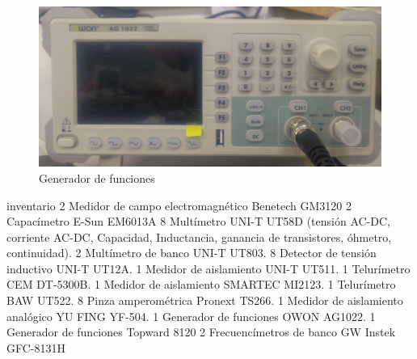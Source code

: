 \begin{figure}[htbp]
  \centering
  \includegraphics[width=\textwidth,height=\textheight,keepaspectratio]{images/fotos/generadordefunciones3.jpg}
  \caption{Generador de funciones}
  \label{fig:generador_funciones_3}
\end{figure}

inventario
2 Medidor de campo electromagnético Benetech GM3120
2 Capacímetro E-Sun EM6013A
8 Multímetro UNI-T UT58D (tensión AC-DC, corriente AC-DC, Capacidad, Inductancia, ganancia de transistores, óhmetro, continuidad).
2 Multímetro de banco UNI-T UT803.
8 Detector de tensión inductivo UNI-T UT12A.
1 Medidor de aislamiento UNI-T UT511.
1 Telurímetro CEM DT-5300B.
1 Medidor de aislamiento SMARTEC MI2123.
1 Telurímetro BAW UT522.
8 Pinza amperométrica Pronext TS266.
1 Medidor de aislamiento analógico YU FING YF-504.
1 Generador de funciones OWON AG1022.
1 Generador de funciones Topward 8120
2 Frecuencímetros de banco GW Instek GFC-8131H